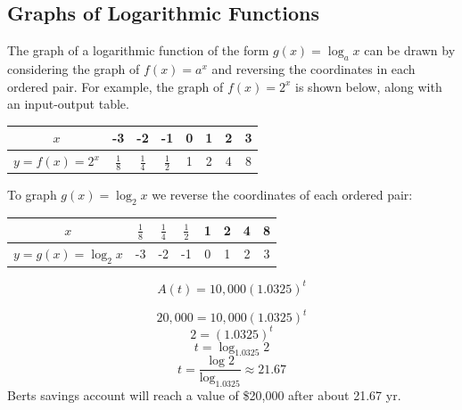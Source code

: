 \documentclass{report}
\begin{document}
\subsection*{Graphs of Logarithmic Functions}
\bigbreak \noindent
The graph of a logarithmic function of the form $g(x) = \log_a x $ can be drawn by considering the graph of $f(x) = a^x$ and reversing the coordinates in each ordered pair. For example, the graph of $f(x) = 2^x$ is shown below, along with an input-output table.
\bigbreak \noindent \bigbreak \noindent
\begin{minipage}{0.5\textwidth}
	\begin{tabular}{|c|c|c|c|c|c|c|c|}
\hline$x$ & -3 & -2 & -1 & 0 & 1 & 2 & 3 \\
\hline$y=f(x)=2^x$ & $\frac{1}{8}$ & $\frac{1}{4}$ & $\frac{1}{2}$ & 1 & 2 & 4 & 8 \\
\hline
\end{tabular}
\end{minipage}
\begin{minipage}{0.45\textwidth}
\end{minipage}
\pagebreak
\noindent
\begin{large}
  To graph $g(x) = \log_2 x$ we reverse the coordinates of each ordered pair:
\end{large}
\bigbreak \noindent \bigbreak \noindent
\begin{minipage}{0.5\textwidth}
 \begin{tabular}{|c|c|c|c|c|c|c|c|}
\hline$x$ & $\frac{1}{8}$ & $\frac{1}{4}$ & $\frac{1}{2}$ & 1 & 2 & 4 & 8 \\
\hline$y=g(x)=\log _2 x$ & -3 & -2 & -1 & 0 & 1 & 2 & 3 \\
\hline
\end{tabular} 
\end{minipage}
\begin{minipage}{0.45\textwidth}
\end{minipage}
\bigbreak \noindent \bigbreak \noindent
{}
\bigbreak \noindent \bigbreak \noindent
{}
\sol
\bigbreak \noindent
$$A(t) = 10,000(1.0325)^t$$

$$ 20,000 = 10,000(1.0325)^t $$
$$ 2 = (1.0325)^t$$
$$t = \log_{1.0325}2$$
$$t = \frac{\log 2}{\log_{1.0325}} \approx 21.67$$
\bigbreak \noindent \bigbreak \noindent
Berts savings account will reach a value of \$20,000 after about 21.67 yr.
\end{document}
